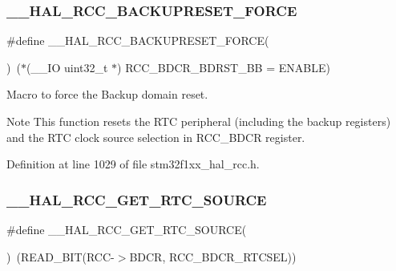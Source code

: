 \subsubsection{\texorpdfstring{\+\_\+\+\_\+\+H\+A\+L\+\_\+\+R\+C\+C\+\_\+\+B\+A\+C\+K\+U\+P\+R\+E\+S\+E\+T\+\_\+\+F\+O\+R\+CE}{\_\_HAL\_RCC\_BACKUPRESET\_FORCE}}
{\footnotesize\ttfamily \#define \+\_\+\+\_\+\+H\+A\+L\+\_\+\+R\+C\+C\+\_\+\+B\+A\+C\+K\+U\+P\+R\+E\+S\+E\+T\+\_\+\+F\+O\+R\+CE(\begin{DoxyParamCaption}{ }\end{DoxyParamCaption})~($\ast$(\+\_\+\+\_\+\+IO uint32\+\_\+t $\ast$) R\+C\+C\+\_\+\+B\+D\+C\+R\+\_\+\+B\+D\+R\+S\+T\+\_\+\+BB = E\+N\+A\+B\+LE)}



Macro to force the Backup domain reset. 

\begin{DoxyNote}{Note}
This function resets the R\+TC peripheral (including the backup registers) and the R\+TC clock source selection in R\+C\+C\+\_\+\+B\+D\+CR register. 
\end{DoxyNote}


Definition at line 1029 of file stm32f1xx\+\_\+hal\+\_\+rcc.\+h.

\mbox{\label{group___r_c_c___r_t_c___clock___configuration_gad40d00ff1c984ebd011ea9f6e7f93c44}} 
\subsubsection{\texorpdfstring{\+\_\+\+\_\+\+H\+A\+L\+\_\+\+R\+C\+C\+\_\+\+G\+E\+T\+\_\+\+R\+T\+C\+\_\+\+S\+O\+U\+R\+CE}{\_\_HAL\_RCC\_GET\_RTC\_SOURCE}}
{\footnotesize\ttfamily \#define \+\_\+\+\_\+\+H\+A\+L\+\_\+\+R\+C\+C\+\_\+\+G\+E\+T\+\_\+\+R\+T\+C\+\_\+\+S\+O\+U\+R\+CE(\begin{DoxyParamCaption}{ }\end{DoxyParamCaption})~(R\+E\+A\+D\+\_\+\+B\+IT(R\+CC-\/$>$B\+D\+CR, R\+C\+C\+\_\+\+B\+D\+C\+R\+\_\+\+R\+T\+C\+S\+EL))}



